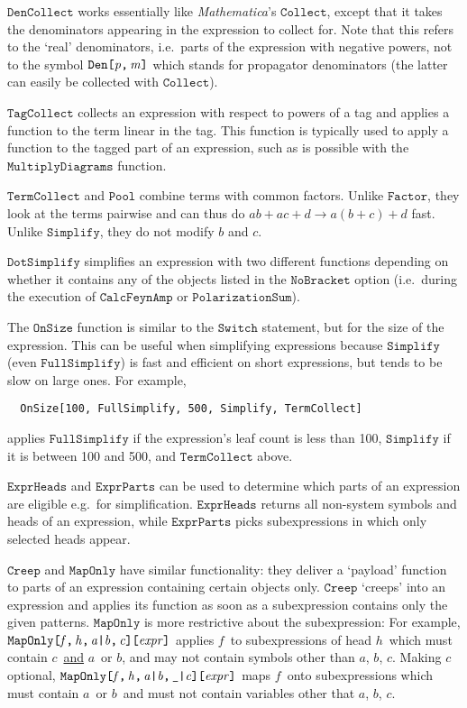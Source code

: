 \documentclass[twoside,11pt]{article}
\def\mma{\textit{Mathematica}}
\def\Var#1{\ensuremath{\mathit{#1}}}
\def\Va{\Var{a}}
\def\Vb{\Var{b}}
\def\Vc{\Var{c}}
\def\Vf{\Var{f}}
\def\Vh{\Var{h}}
\def\Code#1{\ensuremath{\texttt{#1}}}
\def\ie{i.e.\ }
\def\eg{e.g.\ }
\def\uscore{\symbol{95}}
\begin{document}
\Code{DenCollect} works essentially like \mma's \Code{Collect}, except 
that it takes the denominators appearing in the expression to collect
for.  Note that this refers to the `real' denominators, \ie parts of 
the expression with negative powers, not to the symbol
\Code{Den[\Var{p},\,\Var{m}]} which stands for propagator denominators 
(the latter can easily be collected with \Code{Collect}).

\Code{TagCollect} collects an expression with respect to powers of a tag
and applies a function to the term linear in the tag.  This function is
typically used to apply a function to the tagged part of an expression,
such as is possible with the \Code{MultiplyDiagrams} function.

\Code{TermCollect} and \Code{Pool} combine terms with common factors.  
Unlike \Code{Factor}, they look at the terms pairwise and can thus do $a b 
+ a c + d \to a (b + c) + d$ fast.  Unlike \Code{Simplify}, they do not 
modify $b$ and $c$.

\Code{DotSimplify} simplifies an expression with two different functions
depending on whether it contains any of the objects listed in the
\Code{NoBracket} option (\ie during the execution of \Code{CalcFeynAmp}
or \Code{PolarizationSum}).

The \Code{OnSize} function is similar to the \Code{Switch} statement, 
but for the size of the expression.  This can be useful when simplifying 
expressions because \Code{Simplify} (even \Code{FullSimplify}) is fast 
and efficient on short expressions, but tends to be slow on large ones.  
For example,
\begin{verbatim}
  OnSize[100, FullSimplify, 500, Simplify, TermCollect]
\end{verbatim}
applies \Code{FullSimplify} if the expression's leaf count is less than 
100, \Code{Simplify} if it is between 100 and 500, and 
\Code{TermCollect} above.

\Code{ExprHeads} and \Code{ExprParts} can be used to determine which 
parts of an expression are eligible \eg for simplification.  
\Code{ExprHeads} returns all non-system symbols and heads of an 
expression, while \Code{ExprParts} picks subexpressions in which only 
selected heads appear.

\Code{Creep} and \Code{MapOnly} have similar functionality: they deliver 
a `payload' function to parts of an expression containing certain 
objects only.
\Code{Creep} `creeps' into an expression and applies its function as 
soon as a subexpression contains only the given patterns.
\Code{MapOnly} is more restrictive about the subexpression: For example, 
\Code{MapOnly[\Vf,\,\Vh,\,\Va|\Vb,\,\Vc][\Var{expr}]} applies \Vf\ to
subexpressions of head \Vh\ which must contain \Vc\ \underline{and} \Va\ 
or \Vb, and may not contain symbols other than \Va, \Vb, \Vc.  
Making $c$ optional,
\Code{MapOnly[\Vf,\,\Vh,\,\Va|\Vb,\,\uscore|\Vc][\Var{expr}]} 
maps \Vf\ onto subexpressions which must contain \Va\ or \Vb\ and must 
not contain variables other that \Va, \Vb, \Vc.
\end{document}
